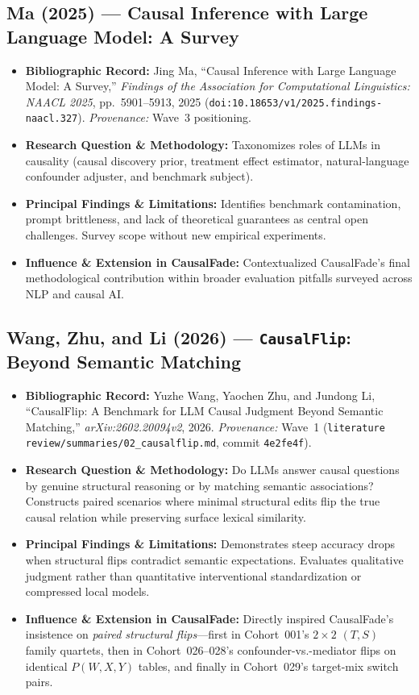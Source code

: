 \subsection{Ma (2025) --- Causal Inference with Large Language Model: A Survey \citep{ma2025survey}}
\begin{itemize}
  \item \textbf{Bibliographic Record:} Jing Ma, ``Causal Inference with Large Language Model: A Survey,'' \emph{Findings of the Association for Computational Linguistics: NAACL 2025}, pp.~5901--5913, 2025 (\texttt{doi:10.18653/v1/2025.findings-naacl.327}). \emph{Provenance:} Wave~3 positioning.
  \item \textbf{Research Question \& Methodology:} Taxonomizes roles of LLMs in causality (causal discovery prior, treatment effect estimator, natural-language confounder adjuster, and benchmark subject).
  \item \textbf{Principal Findings \& Limitations:} Identifies benchmark contamination, prompt brittleness, and lack of theoretical guarantees as central open challenges. Survey scope without new empirical experiments.
  \item \textbf{Influence \& Extension in CausalFade:} Contextualized CausalFade's final methodological contribution within broader evaluation pitfalls surveyed across NLP and causal AI.
\end{itemize}

\subsection{Wang, Zhu, and Li (2026) --- \texttt{CausalFlip}: Beyond Semantic Matching \citep{wang2026causalflip}}
\begin{itemize}
  \item \textbf{Bibliographic Record:} Yuzhe Wang, Yaochen Zhu, and Jundong Li, ``CausalFlip: A Benchmark for LLM Causal Judgment Beyond Semantic Matching,'' \emph{arXiv:2602.20094v2}, 2026. \emph{Provenance:} Wave~1 (\texttt{literature review/summaries/02\_causalflip.md}, commit \texttt{4e2fe4f}).
  \item \textbf{Research Question \& Methodology:} Do LLMs answer causal questions by genuine structural reasoning or by matching semantic associations? Constructs paired scenarios where minimal structural edits flip the true causal relation while preserving surface lexical similarity.
  \item \textbf{Principal Findings \& Limitations:} Demonstrates steep accuracy drops when structural flips contradict semantic expectations. Evaluates qualitative judgment rather than quantitative interventional standardization or compressed local models.
  \item \textbf{Influence \& Extension in CausalFade:} Directly inspired CausalFade's insistence on \emph{paired structural flips}---first in Cohort~001's $2\times 2$ $(T,S)$ family quartets, then in Cohort~026--028's confounder-vs.-mediator flips on identical $P(W,X,Y)$ tables, and finally in Cohort~029's target-mix switch pairs.
\end{itemize}

